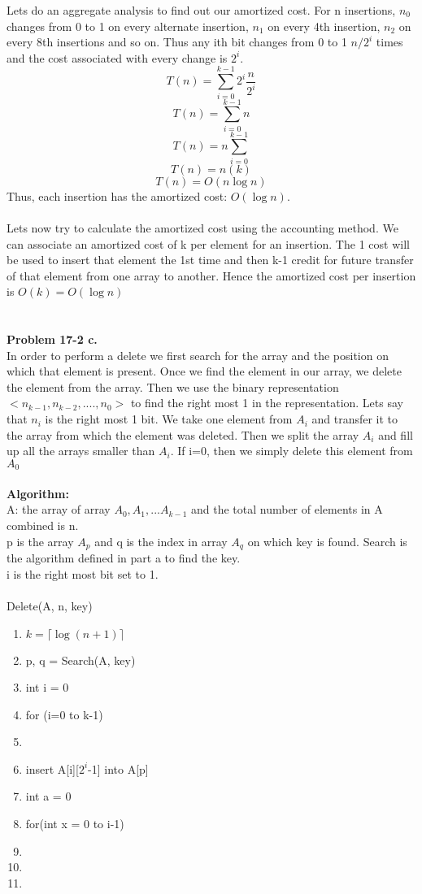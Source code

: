 \documentclass[10pt]{article}
\newcommand{\tab}[1]{\hspace{.05\textwidth}\rlap{#1}}
\begin{document}
Lets do an aggregate analysis to find out our amortized cost. For n insertions, $n_0$ changes from 0 to 1 on every alternate insertion, $n_1$ on every 4th insertion, $n_2$ on every 8th insertions and so on. Thus any ith bit changes from 0 to 1 $n/2^i$ times and the cost associated with every change is $2^i$.
$$T(n) = \sum_{i=0}^{k-1}2^i\dfrac{n}{2^i}$$
$$T(n) = \sum_{i=0}^{k-1}n$$
$$T(n) = n\sum_{i=0}^{k-1}$$
$$T(n) = n(k)$$
$$T(n) = O(n \log n)$$
Thus, each insertion has the amortized cost: $O(\log n)$.\\\\
Lets now try to calculate the amortized cost using the accounting method. We can associate an amortized cost of k per element for an insertion. The 1 cost will be used to insert that element the 1st time and then k-1 credit for future transfer of that element from one array to another. Hence the amortized cost per insertion is $O(k) = O(\log n)$\\\\\\
\textbf{Problem 17-2 c.}\\
In order to perform a delete we first search for the array and the position on which that element is present. Once we find the element in our array, we delete the element from the array. Then we use the binary representation $<n_{k-1}, n_{k-2}, .... , n_0>$ to find the right most 1 in the representation. Lets say that $n_i$ is the right most 1 bit. We take one element from $A_i$ and transfer it to the array from which the element was deleted. Then we split the array $A_i$ and fill up all the arrays smaller than $A_i$. If i=0, then we simply delete this element from $A_0$\\\\
\textbf{Algorithm:}\\
A: the array of array $A_0, A_1, ... A_{k-1}$ and the total number of elements in A combined is n.\\
p is the array $A_p$ and q is the index in array $A_q$ on which key is found. Search is the algorithm defined in part a to find the key.\\
i is the right most bit set to 1.\\\\
Delete(A, n, key)
\begin{enumerate}
\item $k = \lceil \log(n+1) \rceil$
\item p, q = Search(A, key)
\item int i = 0
\item for (i=0 to k-1)
\item \tab{if(A[i].length != 0) break;}
\item insert A[i][$2^i$-1] into A[p]
\item int a = 0
\item for(int x = 0 to i-1)
\item \tab{for(int y= 0 to $2^x-1$)}
\item \tab{\tab{A[x][y] = A[i][a]}} 
\item \tab{\tab{a = a +1}}
\end{enumerate}
\end{document}
